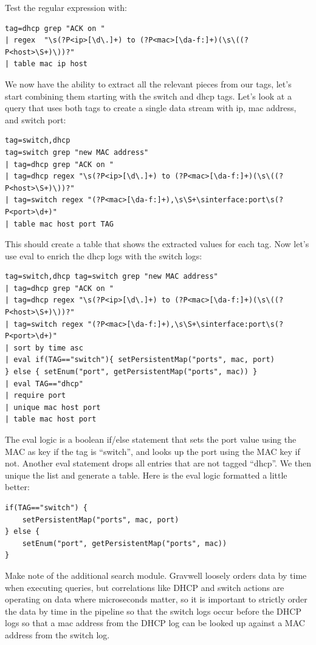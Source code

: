 Test the regular expression with:

\begin{Verbatim}[breaklines=true]
tag=dhcp grep "ACK on " 
| regex  "\s(?P<ip>[\d\.]+) to (?P<mac>[\da-f:]+)(\s\((?P<host>\S+)\))?"
| table mac ip host
\end{Verbatim}

We now have the ability to extract all the relevant pieces from our
tags, let's start combining them starting with the switch and
dhcp tags. Let's look at a query that uses both tags to create a
single data stream with ip, mac address, and switch port:

\begin{Verbatim}[breaklines=true]
tag=switch,dhcp
tag=switch grep "new MAC address" 
| tag=dhcp grep "ACK on " 
| tag=dhcp regex "\s(?P<ip>[\d\.]+) to (?P<mac>[\da-f:]+)(\s\((?P<host>\S+)\))?"
| tag=switch regex "(?P<mac>[\da-f:]+),\s\S+\sinterface:port\s(?P<port>\d+)"
| table mac host port TAG
\end{Verbatim}

This should create a table that shows the extracted values for each
tag. Now let's use eval to enrich the dhcp logs with the switch logs:

\begin{Verbatim}[breaklines=true]
tag=switch,dhcp tag=switch grep "new MAC address"
| tag=dhcp grep "ACK on "
| tag=dhcp regex "\s(?P<ip>[\d\.]+) to (?P<mac>[\da-f:]+)(\s\((?P<host>\S+)\))?"
| tag=switch regex "(?P<mac>[\da-f:]+),\s\S+\sinterface:port\s(?P<port>\d+)"
| sort by time asc
| eval if(TAG=="switch"){ setPersistentMap("ports", mac, port)
} else { setEnum("port", getPersistentMap("ports", mac)) }
| eval TAG=="dhcp" 
| require port 
| unique mac host port 
| table mac host port
\end{Verbatim}

The eval logic is a boolean if/else statement that sets the port value
using the MAC as key if the tag is ``switch'', and looks up the port using the
MAC key if not. Another eval statement drops all entries that are not
tagged ``dhcp''. We then unique the list and generate a table. Here is the eval
logic formatted a little better:

\begin{Verbatim}[breaklines=true]
if(TAG=="switch") {
    setPersistentMap("ports", mac, port)
} else {
    setEnum("port", getPersistentMap("ports", mac))
}
\end{Verbatim}

Make note of the additional  search module.  Gravwell
loosely orders data by time when executing queries, but correlations like
DHCP and switch actions are operating on data where microseconds matter,
so it is important to strictly order the data by time in the pipeline
so that the switch logs occur before the DHCP logs so that a mac address
from the DHCP log can be looked up against a MAC address from the switch log.

